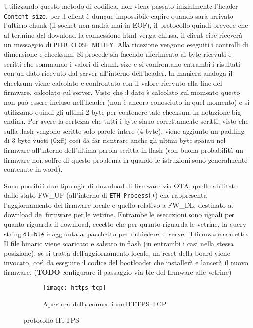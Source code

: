 Utilizzando questo metodo di codifica, non viene passato inizialmente l'header \texttt{Content-size}, per il client \`e dunque impossibile capire quando sar\`a arrivato l'ultimo chunk (il socket non andr\`a mai in EOF), il protocollo quindi prevede che al termine del download la connessione html venga chiusa, il client cio\`e ricever\`a un messaggio di \texttt{PEER\_CLOSE\_NOTIFY}. Alla ricezione vengono eseguiti i controlli di dimensione e checksum. Si procede sia facendo riferimento ai byte ricevuti e scritti che sommando i valori di chunk-size e si confrontano entrambi i risultati con un dato ricevuto dal server all'interno dell'header. In maniera analoga il checksum viene calcolato e confrontato con il valore ricevuto alla fine del firmware, calcolato sul server. Visto che il dato \`e calcolato sul momento questo non pu\`o essere incluso nell'header (non \`e ancora conosciuto in quel momento) e si utilizzano quindi gli ultimi 2 byte per contenere tale checksum in notazione big-endian. Per avere la certezza che tutti i byte siano correttamente scritti, visto che sulla flash vengono scritte solo parole intere (4 byte), viene aggiunto un padding di 3 byte vuoti (0xff) cos\`i da far rientrare anche gli ultimi byte spaiati nel firmware all'interno dell'ultima parola scritta in flash (con buona probabilit\`a un firmware non soffre di questo problema in quando le istruzioni sono generalmente contenute in word).

Sono possibili due tipologie di download di firmware via OTA, quello abilitato dallo stato FW\_UP (all'interno di \texttt{ETH\_Process()}) che rappresenta l'aggiornamento del firmware locale e quello relativo a FW\_DL, destinato al download del firmware per le vetrine. Entrambe le esecuzioni sono uguali per quanto riguarda il download, eccetto che per quanto riguarda le vetrine, la query string \texttt{dl=ble} \`e aggiunta al pacchetto per richiedere al server il firmware corretto. Il file binario viene scaricato e salvato in flash (in entrambi i casi nella stessa posizione), se si tratta dell'aggiornamento locale, un reset della board viene invocato, cos\`i da eseguire il codice del bootloader che installer\`a e lancer\`a il nuovo firmware. (\textbf{TODO} configurare il passaggio via ble del firmware alle vetrine)

\begin{figure}[ht]
  \center
  \begin{subfigure}{\textwidth}
    \texttt{[image: https\_tcp]}
    \caption{Apertura della connessione HTTPS-TCP}
  \end{subfigure}
  \caption{protocollo HTTPS}
  \label{fig:https_tcp}
\end{figure}

